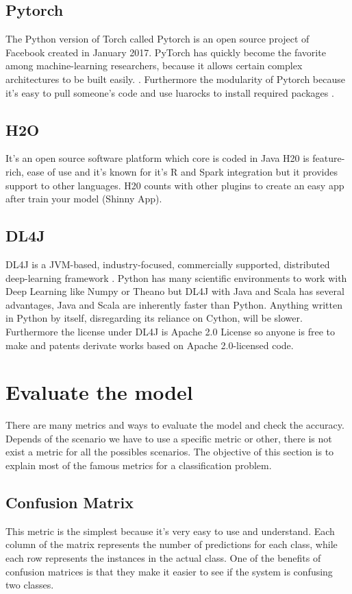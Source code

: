 \subsection[Pytorch]{Pytorch}
The Python version of Torch called Pytorch is an open source project of Facebook created in January 2017. PyTorch has quickly become the favorite among machine-learning researchers, because it allows certain complex architectures to be built easily. \cite{generalcomparaison}. Furthermore the modularity of Pytorch because it's easy to pull someone's code and use  luarocks to install required packages \cite{specificcomparaison}. 

\subsection[H20]{H2O}
It's an open source software platform which core is coded in Java \cite{h20-deeplearning}
H20 is feature-rich, ease of use and it's known for it's R and Spark integration but it provides support to other languages. \cite{h20-comparative-table}
H20 counts with other plugins to create an easy app after train your model (Shinny App).
 
\subsection[DL4J]{DL4J}
DL4J is a JVM-based, industry-focused, commercially supported, distributed deep-learning framework \cite{generalcomparaison}. Python has many scientific environments to work with Deep Learning like Numpy or Theano but DL4J with Java and Scala has several advantages,
Java and Scala are inherently faster than Python. Anything written in Python by itself, disregarding its reliance on Cython, will be slower.
Furthermore the license under DL4J is Apache 2.0 License so anyone is free to make and patents derivate works based on Apache 2.0-licensed code. 

\section[Evaluate the model]{Evaluate the model}
There are many metrics and ways to evaluate the model and check the accuracy. Depends of the scenario we have to use a specific metric or other, there is not exist a metric for all the possibles scenarios. 
The objective of this section is to explain most of the famous metrics for a classification problem.

\subsection[Confusion Matrix]{Confusion Matrix}
This metric is the simplest because it's very easy to use and understand. Each column of the matrix represents the number of predictions for each class, while each row represents the instances in the actual class. One of the benefits of confusion matrices is that they make it easier to see if the system is confusing two classes.

